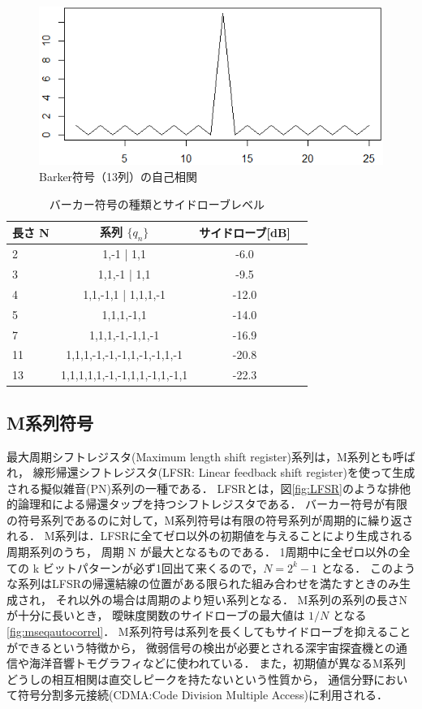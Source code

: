 \begin{figure}[p]\centering
\includegraphics[clip,width=0.9\hsize]{img/barkercode.png}
\caption{Barker符号（13列）の自己相関}\label{fig:barkercode}
\end{figure}

\begin{table}[p]\centering
  \caption{バーカー符号の種類とサイドローブレベル}
  \label{tab:barker}
  \begin{tabular}{l|ccc}
    \hline
    長さ N & 系列 $\{q_n\}$ & サイドローブ[dB] \\
    \hline
    2  & 1,-1 | 1,1                   & -6.0 \\
    3  & 1,1,-1 | 1,1                 & -9.5 \\
    4  & 1,1,-1,1 | 1,1,1,-1          & -12.0 \\
    5  & 1,1,1,-1,1                    & -14.0 \\
    7  & 1,1,1,-1,-1,1,-1              & -16.9 \\
    11 & 1,1,1,-1,-1,-1,1,-1,-1,1,-1   & -20.8 \\
    13 & 1,1,1,1,1,-1,-1,1,1,-1,1,-1,1 & -22.3 \\
    \hline
  \end{tabular}
\end{table}



\subsection{M系列符号}
最大周期シフトレジスタ(Maximum length shift register)系列は，M系列とも呼ばれ，
線形帰還シフトレジスタ(LFSR: Linear feedback shift register)を使って生成される擬似雑音(PN)系列の一種である．
LFSRとは，図\ref{fig:LFSR}のような排他的論理和による帰還タップを持つシフトレジスタである．
バーカー符号が有限の符号系列であるのに対して，M系列符号は有限の符号系列が周期的に繰り返される．
M系列は．LFSRに全てゼロ以外の初期値を与えることにより生成される周期系列のうち，
周期 N が最大となるものである．
1周期中に全ゼロ以外の全ての k ビットパターンが必ず1回出て来くるので，$N=2^k-1$ となる．
このような系列はLFSRの帰還結線の位置がある限られた組み合わせを満たすときのみ生成され，
それ以外の場合は周期のより短い系列となる．
M系列の系列の長さNが十分に長いとき，
曖昧度関数のサイドローブの最大値は $1/N$ となる\ref{fig:mseqautocorrel}．
M系列符号は系列を長くしてもサイドローブを抑えることができるという特徴から，
微弱信号の検出が必要とされる深宇宙探査機との通信\cite{dsn}や海洋音響トモグラフィ\cite{tomography}などに使われている．
また，初期値が異なるM系列どうしの相互相関は直交しピークを持たないという性質から，
通信分野において符号分割多元接続(CDMA:Code Division Multiple Access)に利用される．

